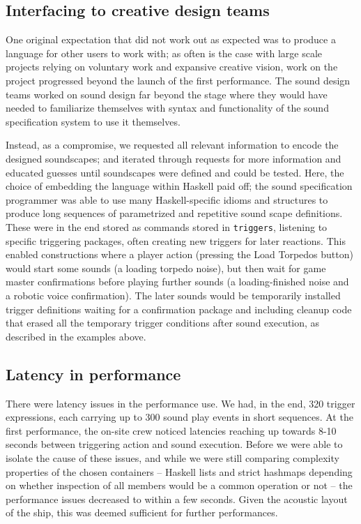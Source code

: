 \subsection{Interfacing to creative design teams}
\label{sec:interf-creat-design}

One original expectation that did not work out as expected was to
produce a language for other users to work with; as often is the case
with large scale projects relying on voluntary work and expansive
creative vision, work on the project progressed beyond the launch of
the first performance. The sound design teams worked on sound design
far beyond the stage where they would have needed to familiarize
themselves with syntax and functionality of the sound specification
system to use it themselves.

Instead, as a compromise, we requested all relevant information to
encode the designed soundscapes; and iterated through requests for
more information and educated guesses until soundscapes were defined
and could be tested. Here, the choice of embedding the language within
Haskell paid off; the sound specification programmer was able to use
many Haskell-specific idioms and structures to produce long sequences
of parametrized and repetitive sound scape definitions. These were in
the end stored as commands stored in \texttt{triggers}, listening to specific triggering packages,
often creating new triggers for later reactions. This enabled
constructions where a player action (pressing the Load Torpedos
button) would start some sounds (a loading torpedo noise), but then
wait for game master confirmations before playing further sounds (a
loading-finished noise and a robotic voice confirmation). The later
sounds would be temporarily installed trigger definitions waiting for
a confirmation package and including cleanup code that erased all the
temporary trigger conditions after sound execution, as described in
the examples above.

\subsection{Latency in performance}
\label{sec:latency-performance}

There were latency issues in the performance use. We had, in the end,
320 trigger expressions, each carrying up to 300 sound play events in
short sequences. At the first performance, the on-site crew noticed
latencies reaching up towards 8-10 seconds between triggering action
and sound execution. Before we were able to isolate the cause of these
issues, and while we were still comparing complexity properties of the
chosen containers -- Haskell lists and strict hashmaps depending on
whether inspection of all members would be a common operation or not
-- the performance issues decreased to within a few seconds. Given the
acoustic layout of the ship, this was deemed sufficient for further
performances. 

